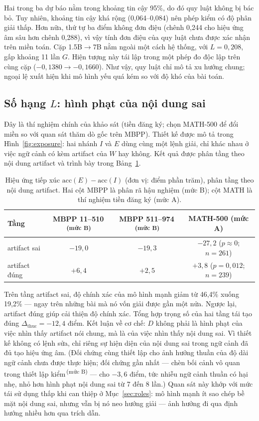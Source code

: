 \documentclass[12pt,a4paper]{article}
\newcommand{\mucB}{\textsuperscript{\,(mức B)}}
\newcommand{\dhonest}{\Delta_{\mathrm{thuc}}}
\newcommand{\acc}{\mathrm{acc}}
\begin{document}
Hai trong ba dự báo nằm trong khoảng tin cậy 95\%, do đó quy luật không bị bác bỏ. Tuy nhiên, khoảng tin cậy khá rộng (0,064--0,084) nên phép kiểm có độ phân giải thấp. Hơn nữa, thứ tự ba điểm không đơn điệu (chênh 0,244 cho hiệu ứng âm sâu hơn chênh 0,288), vì vậy tính đơn điệu của quy luật chưa được xác nhận trên miền toán. Cặp 1.5B\(\to\)7B nằm ngoài một cách hệ thống, với \(L = 0{,}208\), gấp khoảng 11 lần \(G\). Hiện tượng này tái lập trong một phép đo độc lập trên cùng cặp (\(-0{,}1380 \to -0{,}1660\)). Như vậy, quy luật chỉ mô tả xu hướng chung; ngoại lệ xuất hiện khi mô hình yếu quá kém so với độ khó của bài toán.

\subsection{Số hạng \(L\): hình phạt của nội dung sai}\label{sec:termL}

Đây là thí nghiệm chính của khảo sát (tiền đăng ký; chọn MATH-500 để đổi miền so với quan sát thăm dò gốc trên MBPP). Thiết kế được mô tả trong Hình~\ref{fig:exposure}: hai nhánh \(I\) và \(E\) dùng cùng một lệnh giải, chỉ khác nhau ở việc ngữ cảnh có kèm artifact của \(W\) hay không. Kết quả được phân tầng theo nội dung artifact và trình bày trong Bảng~\ref{tab:exposure}.

\begin{table}[htbp]
\centering
\small
\begin{tabular}{@{}l c c c@{}}
\toprule
Tầng & MBPP 11--510\mucB & MBPP 511--974\mucB & MATH-500 (mức A)\\
\midrule
artifact sai  & \(-19{,}0\) & \(-19{,}3\) & \(-27{,}2\) (\(p\approx 0\); \(n=261\))\\
artifact đúng & \(+6{,}4\) & \(+2{,}5\) & \(+3{,}8\) (\(p=0{,}012\); \(n=239\))\\
\bottomrule
\end{tabular}
\caption{Hiệu ứng tiếp xúc \(\acc(E)-\acc(I)\) (đơn vị: điểm phần trăm), phân tầng theo nội dung artifact. Hai cột MBPP là phân rã hậu nghiệm (mức B); cột MATH là thí nghiệm tiền đăng ký (mức A).}
\label{tab:exposure}
\end{table}

Trên tầng artifact sai, độ chính xác của mô hình mạnh giảm từ 46,4\% xuống 19,2\% --- ngay trên những bài mà nó vốn giải được gần một nửa. Ngược lại, artifact đúng giúp cải thiện độ chính xác. Tổng hợp trọng số của hai tầng tái tạo đúng \(\dhonest = -12{,}4\) điểm. Kết luận về cơ chế: \(D\) không phải là hình phạt của việc nhìn thấy artifact nói chung, mà là của việc nhìn thấy nội dung sai. Vì thiết kế không có lệnh sửa, chỉ riêng sự hiện diện của nội dung sai trong ngữ cảnh đã đủ tạo hiệu ứng âm. (Đối chứng cùng thiết lập cho ảnh hưởng thuần của độ dài ngữ cảnh chưa được thực hiện; đối chứng gần nhất --- chèn bối cảnh vô quan trong thiết lập kiểm\mucB{} --- cho \(-3{,}6\) điểm, tức nhiễu ngữ cảnh thuần có hại nhẹ, nhỏ hơn hình phạt nội dung sai từ 7 đến 8 lần.) Quan sát này khớp với mức tái sử dụng thấp khi can thiệp ở Mục~\ref{sec:roles}: mô hình mạnh ít sao chép bề mặt nội dung sai, nhưng vẫn bị nó neo hướng giải --- ảnh hưởng đi qua định hướng nhiều hơn qua trích dẫn.
\end{document}
